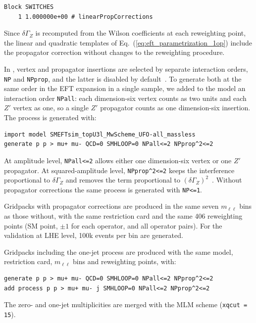 \begin{verbatim}
Block SWITCHES
    1 1.000000e+00 # linearPropCorrections
\end{verbatim}

Since $\delta\Gamma_Z$ is recomputed from the Wilson coefficients at each
reweighting point, the linear and quadratic templates of
Eq.~(\ref{eq:eft_parametrization_1op})
include the propagator correction without changes to the reweighting procedure.

In \smeftsim{}, vertex and propagator insertions are selected by separate
interaction orders, \texttt{NP} and \texttt{NPprop}, and the latter is disabled
by default~\cite{Brivio:2020onw}. To generate both at the same order in the EFT
expansion in a single sample, we added to the model an interaction order
\texttt{NPall}: each dimension-six vertex
counts as two units and each $Z'$ vertex as one, so a single $Z'$ propagator
counts as one dimension-six insertion. The process is generated with:

\begin{verbatim}
import model SMEFTsim_topU3l_MwScheme_UFO-all_massless
generate p p > mu+ mu- QCD=0 SMHLOOP=0 NPall<=2 NPprop^2<=2
\end{verbatim}

\noindent At amplitude level, \texttt{NPall<=2} allows either one dimension-six
vertex or one $Z'$ propagator. At squared-amplitude level, \texttt{NPprop\^{}2<=2}
keeps the interference proportional to $\delta\Gamma_Z$ and removes the term
proportional to $(\delta\Gamma_Z)^2$~\cite{Brivio:2020onw}. Without propagator
corrections the same process is generated with \texttt{NP<=1}.

Gridpacks with propagator corrections are produced in the same seven
$m_{\ell\ell}$ bins as those without, with the same restriction card and the same
406 reweighting points (SM point, $\pm1$ for each operator, and all operator
pairs). For the validation at LHE level, 100k events per bin are generated.

Gridpacks including the one-jet process are produced with the same model,
restriction card, $m_{\ell\ell}$ bins and reweighting points, with:

\begin{verbatim}
generate p p > mu+ mu- QCD=0 SMHLOOP=0 NPall<=2 NPprop^2<=2
add process p p > mu+ mu- j SMHLOOP=0 NPall<=2 NPprop^2<=2
\end{verbatim}

\noindent The zero- and one-jet multiplicities are merged with the MLM scheme
(\texttt{xqcut = 15}\GeV).

